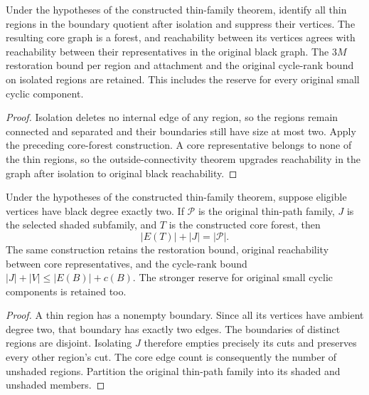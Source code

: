 \begin{theorem}
  \label{thm:lowerbounds-algebraic-constructed-core-forest}
  \leanok
  Under the hypotheses of the constructed thin-family theorem, identify
  all thin regions in the boundary quotient after isolation and suppress
  their vertices. The resulting core graph is a forest, and reachability
  between its vertices agrees with reachability between their representatives
  in the original black graph. The $3M$ restoration bound per region and
  attachment and the original cycle-rank bound on isolated regions are retained.
  This includes the reserve for every original small cyclic component.
\end{theorem}
\begin{proof}
  \leanok
  Isolation deletes no internal edge of any region, so the regions remain
  connected and separated and their boundaries still have size at most two.
  Apply the preceding core-forest construction. A core representative belongs
  to none of the thin regions, so the outside-connectivity theorem upgrades
  reachability in the graph after isolation to original black reachability.
\end{proof}

\begin{theorem}
  \label{thm:lowerbounds-algebraic-constructed-core-count}
  \leanok
  Under the hypotheses of the constructed thin-family theorem, suppose
  eligible vertices have black degree exactly two. If $\mathcal P$ is the
  original thin-path family, $J$ is the selected shaded subfamily, and
  $T$ is the constructed core forest, then
  \[
    |E(T)|+|J|=|\mathcal P|.
  \]
  The same construction retains the restoration bound, original
  reachability between core representatives, and the cycle-rank bound
  $|J|+|V|\le |E(B)|+c(B)$.
  The stronger reserve for original small cyclic components is retained too.
\end{theorem}
\begin{proof}
  \leanok
  A thin region has a nonempty boundary. Since all its vertices have
  ambient degree two, that boundary has exactly two edges. The boundaries
  of distinct regions are disjoint. Isolating $J$ therefore empties
  precisely its cuts and preserves every other region's cut. The core
  edge count is consequently the number of unshaded regions. Partition
  the original thin-path family into its shaded and unshaded members.
\end{proof}

